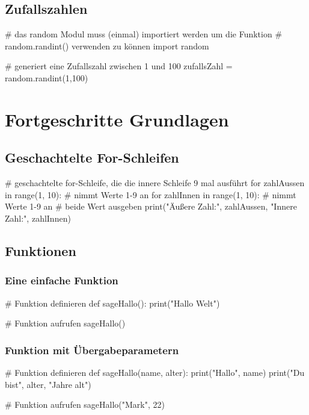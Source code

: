 \documentclass{\VorlagenPfad/coderdojokatext}
\begin{document}
\section{Zufallszahlen}

\begin{pythoncode}
# das random Modul muss (einmal) importiert werden um die Funktion
# random.randint() verwenden zu können
import random 

# generiert eine Zufallszahl zwischen 1 und 100
zufallsZahl = random.randint(1,100)
\end{pythoncode}






\chapter{Fortgeschritte Grundlagen}

\section{Geschachtelte For-Schleifen}
\begin{pythoncode}
# geschachtelte for-Schleife, die die innere Schleife 9 mal ausführt	
for zahlAussen in range(1, 10): 	# nimmt Werte 1-9 an
	for zahlInnen in range(1, 10):	# nimmt Werte 1-9 an
		# beide Wert ausgeben
		print("Äußere Zahl:", zahlAussen, "Innere Zahl:", zahlInnen) 
\end{pythoncode}

\section{Funktionen}

\subsection{Eine einfache Funktion}
\begin{pythoncode}
# Funktion definieren
def sageHallo():
	print("Hallo Welt")
	
# Funktion aufrufen
sageHallo()	
\end{pythoncode}

\subsection{Funktion mit Übergabeparametern}
\begin{pythoncode}
# Funktion definieren
def sageHallo(name, alter):
	print("Hallo", name)
	print("Du bist", alter, "Jahre alt")

# Funktion aufrufen
sageHallo("Mark", 22)	
\end{pythoncode}
\end{document}
